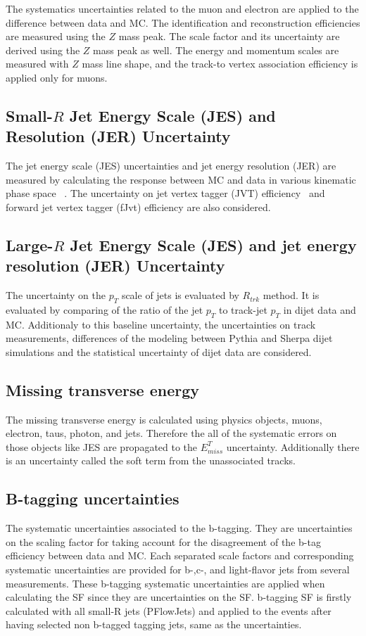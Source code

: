 The systematics uncertainties related to the muon and electron are applied to the difference between data and MC. The identification and reconstruction efficiencies are measured using the $Z$ mass peak. The scale factor and its uncertainty are derived using the $Z$ mass peak as well. The energy and momentum scales are measured with $Z$ mass line shape, and the track-to vertex association efficiency is applied only for muons.
\subsection{Small-$R$ Jet Energy Scale (JES) and Resolution (JER) Uncertainty}
The jet energy scale (JES) uncertainties and jet energy resolution (JER) are measured by calculating the response between MC and data in various kinematic phase space ~\cite{JetUncertainties}.
The uncertainty on jet vertex tagger (JVT) efficiency~\cite{JVTCalib} and forward jet vertex tagger (fJvt) efficiency are also considered.
\subsection{Large-$R$ Jet Energy Scale (JES) and jet energy resolution (JER) Uncertainty}
\label{sec:fatjetUncert}
The uncertainty on the $p_T$ scale of jets is evaluated by $R_{trk}$ method. It is evaluated by comparing of the ratio of the jet $p_T$ to track-jet $p_T$ in dijet data and MC.
Additionaly to this baseline uncertainty, the uncertainties on track measurements, differences of the modeling between Pythia and Sherpa dijet simulations and the statistical uncertainty of dijet data are considered.
\subsection{Missing transverse energy}
The missing transverse energy is calculated using physics objects, muons, electron, taus, photon, and jets. Therefore the all of the systematic errors on those objects like JES are propagated to the $E^T_{miss}$ uncertainty.
Additionally there is an uncertainty called the soft term from the unassociated tracks.
\subsection{B-tagging uncertainties}
The systematic uncertainties associated to the b-tagging.
They are uncertainties on the scaling factor for taking account for the disagreement of the b-tag efficiency between data and MC. Each separated scale factors and corresponding systematic uncertainties are provided for b-,c-, and light-flavor jets from several measurements.
These b-tagging systematic uncertainties are applied when calculating the SF since they are uncertainties on the SF. b-tagging SF is firstly calculated with all small-R jets (PFlowJets) and applied to the events after having selected non b-tagged tagging jets, same as the uncertainties. 
